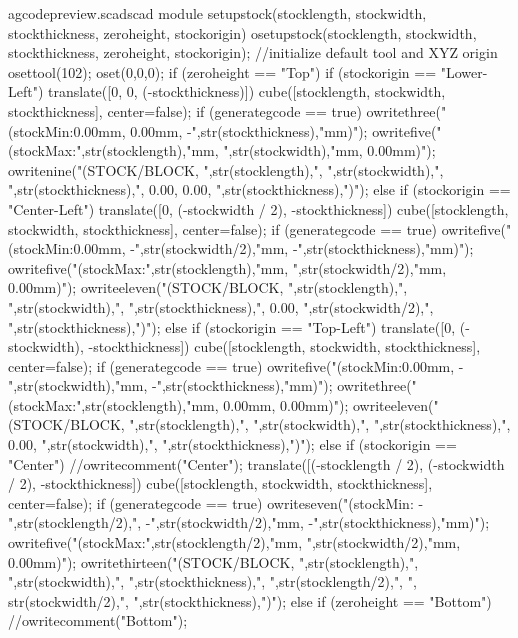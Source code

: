 \documentclass{ltxdoc}
\begin{document}
\lstset{firstnumber=\thegcpscad}
\begin{writecode}{a}{gcodepreview.scad}{scad}
module setupstock(stocklength, stockwidth, stockthickness, zeroheight, stockorigin) {
  osetupstock(stocklength, stockwidth, stockthickness, zeroheight, stockorigin);
//initialize default tool and XYZ origin
  osettool(102);
  oset(0,0,0);
  if (zeroheight == "Top") {
    if (stockorigin == "Lower-Left") {
    translate([0, 0, (-stockthickness)]){
    cube([stocklength, stockwidth, stockthickness], center=false);
      if (generategcode == true) {
      owritethree("(stockMin:0.00mm, 0.00mm, -",str(stockthickness),"mm)");
      owritefive("(stockMax:",str(stocklength),"mm, ",str(stockwidth),"mm, 0.00mm)");
      owritenine("(STOCK/BLOCK, ",str(stocklength),", ",str(stockwidth),", ",str(stockthickness),", 0.00, 0.00, ",str(stockthickness),")");
    }
  }
}
     else if (stockorigin == "Center-Left") {
    translate([0, (-stockwidth / 2), -stockthickness]){
      cube([stocklength, stockwidth, stockthickness], center=false);
    if (generategcode == true) {
owritefive("(stockMin:0.00mm, -",str(stockwidth/2),"mm, -",str(stockthickness),"mm)");
owritefive("(stockMax:",str(stocklength),"mm, ",str(stockwidth/2),"mm, 0.00mm)");
    owriteeleven("(STOCK/BLOCK, ",str(stocklength),", ",str(stockwidth),", ",str(stockthickness),", 0.00, ",str(stockwidth/2),", ",str(stockthickness),")");
    }
  }
    } else if (stockorigin == "Top-Left") {
    translate([0, (-stockwidth), -stockthickness]){
      cube([stocklength, stockwidth, stockthickness], center=false);
if (generategcode == true) {
owritefive("(stockMin:0.00mm, -",str(stockwidth),"mm, -",str(stockthickness),"mm)");
owritethree("(stockMax:",str(stocklength),"mm, 0.00mm, 0.00mm)");
owriteeleven("(STOCK/BLOCK, ",str(stocklength),", ",str(stockwidth),", ",str(stockthickness),", 0.00, ",str(stockwidth),", ",str(stockthickness),")");
    }
  }
    }
    else if (stockorigin == "Center") {
//owritecomment("Center");
    translate([(-stocklength / 2), (-stockwidth / 2), -stockthickness]){
      cube([stocklength, stockwidth, stockthickness], center=false);
if (generategcode == true) {
owriteseven("(stockMin: -",str(stocklength/2),", -",str(stockwidth/2),"mm, -",str(stockthickness),"mm)");
owritefive("(stockMax:",str(stocklength/2),"mm, ",str(stockwidth/2),"mm, 0.00mm)");
owritethirteen("(STOCK/BLOCK, ",str(stocklength),", ",str(stockwidth),", ",str(stockthickness),", ",str(stocklength/2),", ", str(stockwidth/2),", ",str(stockthickness),")");
      }
    }
  }
} else if (zeroheight == "Bottom") {
//owritecomment("Bottom");
}}
\end{writecode}
\end{document}
